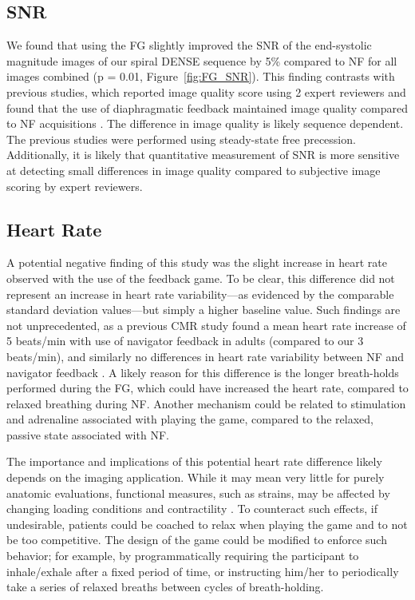 	\subsection{SNR}
		We found that using the FG slightly improved the SNR of the end-systolic magnitude images of our spiral DENSE sequence by 5\% compared to NF for all images combined (p = 0.01, Figure~\ref{fig:FG_SNR}). This finding contrasts with previous studies, which reported image quality score using 2 expert reviewers and found that the use of diaphragmatic feedback maintained image quality compared to NF acquisitions \cite{Feuerlein2009,Jhooti2011}. The difference in image quality is likely sequence dependent. The previous studies were performed using steady-state free precession. Additionally, it is likely that quantitative measurement of SNR is more sensitive at detecting small differences in image quality compared to subjective image scoring by expert reviewers.
	
	\subsection{Heart Rate}
		A potential negative finding of this study was the slight increase in heart rate observed with the use of the feedback game. To be clear, this difference did not represent an increase in heart rate variability—as evidenced by the comparable standard deviation values—but simply a higher baseline value. Such findings are not unprecedented, as a previous CMR study found a mean heart rate increase of 5 beats/min with use of navigator feedback in adults (compared to our 3 beats/min), and similarly no differences in heart rate variability between NF and navigator feedback \cite{Feuerlein2009}. A likely reason for this difference is the longer breath-holds performed during the FG, which could have increased the heart rate, compared to relaxed breathing during NF. Another mechanism could be related to stimulation and adrenaline associated with playing the game, compared to the relaxed, passive state associated with NF.
		
		The importance and implications of this potential heart rate difference likely depends on the imaging application. While it may mean very little for purely anatomic evaluations, functional measures, such as strains, may be affected by changing loading conditions and contractility \cite{Boettler2005}. To counteract such effects, if undesirable, patients could be coached to relax when playing the game and to not be too competitive. The design of the game could be modified to enforce such behavior; for example, by programmatically requiring the participant to inhale/exhale after a fixed period of time, or instructing him/her to periodically take a series of relaxed breaths between cycles of breath-holding.
	
